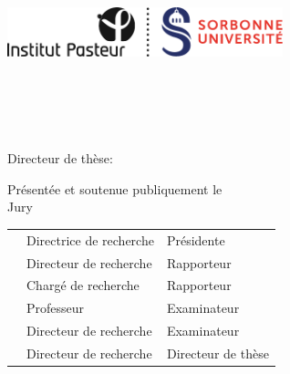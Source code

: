 %
%

\begin{titlepage}
	\thispagestyle{fancytitlepage}
	\tgherosfont
	\centering

	{\Huge \thesisUniversity} \\[2mm]
    {\Large \thesisUniversityDepartment} \\[2mm]
	\includegraphics[width=8cm]{FrontBackMatter/gfx/UPMC_Sorbonne_Universites_Logo} \\[2mm]	
	\textsf{\large \thesisUniversityGroup} \\
    \textsf{\large \thesisUniversityInstitute} \\

	\vfill
	{\large \thesisSubject} \\[10mm]
	{\LARGE \color{ctcolortitle}\textbf{\thesisTitle} \\[10mm]}
	{\Large \thesisName} \\[5mm]
    {\Large Directeur de thèse: \textbf{\thesisFirstSupervisor}}\\
    \vfill
    
    {\large Présentée et soutenue publiquement le \thesisDate }\\[5mm]
    {\large Jury}\\
	\begin{tabular}{>{\Large\bfseries}l>{\Large}l>{\Large}l}
		\thesisPresident & Directrice de recherche & Présidente\\
		\thesisFirstReviewer & Directeur de recherche & Rapporteur\\
		\thesisSecondReviewer & Chargé de recherche & Rapporteur\\
		\thesisFirstExaminer & Professeur & Examinateur\\
		\thesisSecondExaminer & Directeur de recherche & Examinateur\\
		\thesisFirstSupervisor & Directeur de recherche & Directeur de thèse\\
	\end{tabular}
\end{titlepage}


